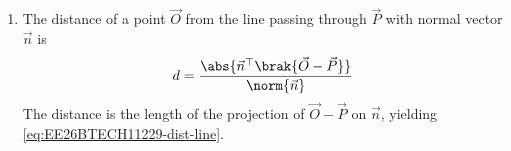 \begin{enumerate}[label=\thesubsection.\arabic*, ref=\thesubsection.\theenumi]
\begin{align}
	\vec{x} = \vec{A} + t\brak{\frac{\vec{B}-\vec{A}}{\norm{\vec{B}-\vec{A}}} + \frac{\vec{D}-\vec{A}}{\norm{\vec{D}-\vec{A}}}}, \quad t \in \mathbb{R}
	\label{eq:EE26BTECH11229-angle-bisector}
\end{align}
\solution
The two terms in the bracket are unit vectors along the sides $\vec{A}\vec{B}$ and $\vec{A}\vec{D}$. Their sum is the diagonal of a rhombus, which bisects the angle between them, yielding \eqref{eq:EE26BTECH11229-angle-bisector}.
\item The distance of a point $\vec{O}$ from the line passing through $\vec{P}$ with normal vector $\vec{n}$ is
\begin{align}
	d = \frac{\abs{\vec{n}^{\top}\brak{\vec{O}-\vec{P}}}}{\norm{\vec{n}}}
	\label{eq:EE26BTECH11229-dist-line}
\end{align}
\solution
The distance is the length of the projection of $\vec{O}-\vec{P}$ on $\vec{n}$, yielding \eqref{eq:EE26BTECH11229-dist-line}.
\end{enumerate}
